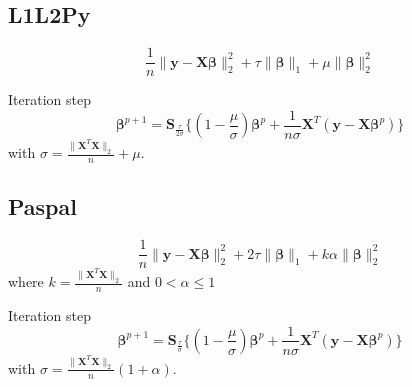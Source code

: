 \documentclass[a4paper,10pt]{article}
\newcommand{\bbeta}{\boldsymbol{\beta}}
\newcommand{\X}{\mathbf{X}}
\newcommand{\y}{\mathbf{y}}
\begin{document}
\subsection{L1L2Py}
\begin{equation}
  \frac{1}{n} \| \y - \X \bbeta \|_2^2 
      + \tau \| \bbeta \|_1 + \mu \| \bbeta \|_2^2
\end{equation}

\noindent
Iteration step
\begin{equation}
    \bbeta^{p+1} = \mathbf{S}_{\frac{\tau}{2\sigma}}\{ 
                          (1 - \frac{\mu}{\sigma})\bbeta^p + 
                          \frac{1}{n\sigma}\X^T(\y - \X\bbeta^p)
                    \}
\end{equation}
with $\sigma = \frac{\|\X^T\X\|_2}{n} + \mu$.

\subsection{Paspal}
\begin{equation}
  \frac{1}{n} \| \y - \X \bbeta \|_2^2 
      + 2\tau \| \bbeta \|_1 + k\alpha \| \bbeta \|_2^2
\end{equation}
where $k = \frac{\|\X^T\X\|_2}{n}$ and $0 < \alpha \leq 1$

\noindent
Iteration step
\begin{equation}
    \bbeta^{p+1} = \mathbf{S}_{\frac{\tau}{\sigma}}\{ 
                          (1 - \frac{\mu}{\sigma})\bbeta^p + 
                          \frac{1}{n\sigma}\X^T(\y - \X\bbeta^p)
                    \}
\end{equation}
with $\sigma = \frac{\|\X^T\X\|_2}{n}(1 + \alpha)$.
\end{document}
